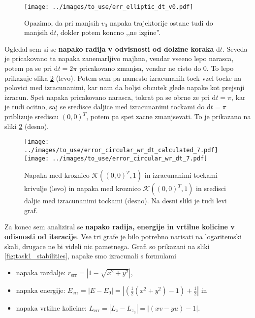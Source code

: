 \documentclass[11pt, a4paper]{article}
\begin{document}
    \begin{figure}[H]
        \centering
        \texttt{[image: ../images/to\_use/err\_elliptic\_dt\_v0.pdf]}
        \caption{Opazimo, da pri manjsih $v_0$ napaka trajektorije ostane tudi do manjsih $\text{d}t$, dokler potem koncno ,,ne izgine''.}
        \label{fig:task1_errs_elliptic}
    \end{figure}

    Ogledal sem si se \textbf{napako radija v odvisnosti od dolzine koraka} $\text{d}t$. Seveda je pricakovano ta napaka zanemarljivo majhna, vendar vseeno lepo narasca, potem pa se pri $\text{d}t = 2\pi$ pricakovano
    zmanjsa, vendar ne cisto do $0$. To lepo prikazuje slika \ref{fig:task1_err_points} (levo). Potem sem pa namesto izracunanih tock vzel tocke na polovici
    med izracunanimi, kar nam da boljsi obcutek glede napake kot prejsnji izracun. Spet napaka pricakovano narasca, tokrat pa se obrne ze pri $\text{d}t = \pi$, kar je tudi ocitno,
    saj se sredisce daljice med izracunanimi tockami do $\text{d}t = \pi$ priblizuje srediscu $(0,0)^T$, potem pa spet zacne zmanjsevati. To je prikazano na sliki \ref{fig:task1_err_points} (desno).

    \begin{figure}[H]
        \centering
        \texttt{[image: ../images/to\_use/error\_circular\_wr\_dt\_calculated\_7.pdf]}
        \texttt{[image: ../images/to\_use/error\_circular\_wr\_dt\_7.pdf]}
        \caption{Napaka med kroznico $\mathcal{K}((0,0)^T, 1)$ in izracunanimi tockami krivulje (levo) in napaka med kroznico $\mathcal{K}((0,0)^T,1)$ in sredisci daljic med izracunanimi tockami
        (desno). Na desni sliki je tudi levi graf.}
        \label{fig:task1_err_points}
    \end{figure}

    Za konec sem analiziral se \textbf{napako radija, energije in vrtilne kolicine v odisnosti od iteracije}.
    Vse tri grafe je bilo potrebno narisati na logaritemski skali, drugace ne bi videli nic pametnega. Grafi so prikazani na sliki \ref{fig:task1_stabilities}, napake smo izracunali s formulami
    \begin{itemize}
        \item napaka razdalje: $r_{\text{err}} = |1 - \sqrt{x^2 + y^2}|$,
        \item napaka energije: $E_{\text{err}} = |E - E_0| = \left| \left(\frac{1}{2} (x^2+y^2) - 1 \right) + \frac{1}{2} \right|$ in
        \item napaka vrtilne kolicine: $L_{\text{err}} = |L_z - L_{z_0}| = |(xv - yu) - 1|$.
    \end{itemize}
\end{document}
